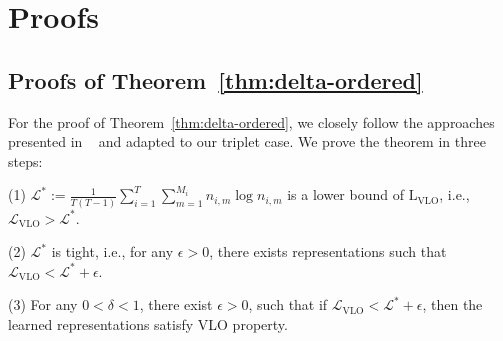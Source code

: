 \appendix
\onecolumn
\section{Proofs}
\subsection{Proofs of Theorem~\ref{thm:delta-ordered}} \label{sec:proof_order}
For the proof of Theorem~\ref{thm:delta-ordered}, we closely follow the approaches presented in ~\cite{nips23-rnc} and adapted to our triplet case. We prove the theorem in three steps: 

\noindent(1) $\mathcal{L}^*:=\frac{1}{T(T-1)} \sum\limits_{i=1}^{T} \sum\limits_{m=1}^{M_i}n_{i, m} \log n_{i, m}$ is a lower bound of $\mathrm{L}_\mathrm{VLO}$, i.e., $\mathcal{L}_{\mathrm{VLO}} > \mathcal{L}^*$. 

\noindent(2) $\mathcal{L}^*$ is tight, i.e., for any $\epsilon > 0$, there exists representations such that $\mathcal{L}_{\mathrm{VLO}} < \mathcal{L}^* + \epsilon$. 

\noindent(3) For any $0 < \delta < 1$, there exist $\epsilon > 0$, such that if $\mathcal{L}_{\mathrm{VLO}} < \mathcal{L}^* + \epsilon$, then the learned representations satisfy VLO property.

